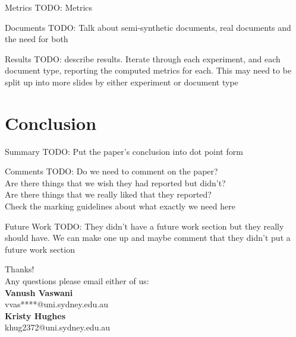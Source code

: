 \documentclass{lecture}
\begin{document}
\begin{plain}{Metrics}
TODO: Metrics
\end{plain}

\begin{plain}{Documents}
TODO: Talk about semi-synthetic documents, real documents and the need for both
\end{plain}

\begin{plain}{Results}
TODO: describe results. Iterate through each experiment, and each document type, reporting the computed metrics for each. This may need to be split up into more slides by either experiment or document type
\end{plain}

\section[Conclusion]{Conclusion}
\begin{plain}{Summary}
TODO: Put the paper's conclusion into dot point form
\end{plain}

\begin{plain}{Comments}
TODO: Do we need to comment on the paper?\\
Are there things that we wish they had reported but didn't?\\
Are there things that we really liked that they reported?\\
Check the marking guidelines about what exactly we need here\\
\end{plain}

\begin{plain}{Future Work}
TODO: They didn't have a future work section but they really should have. We can make one up and maybe comment that they didn't put a future work section
\end{plain}

\begin{plain}{}
\begin{center}
\Huge
Thanks!\\
\vspace{3ex}
\Large
Any questions please email either of us:\\
\vspace{2ex}
\large
\textbf{Vanush Vaswani}\\
\normalsize
vvas****@uni.sydney.edu.au\\
\vspace{1ex}
\large
\textbf{Kristy Hughes}\\
\normalsize
khug2372@uni.sydney.edu.au
\end{center}
\end{plain}
\end{document}
